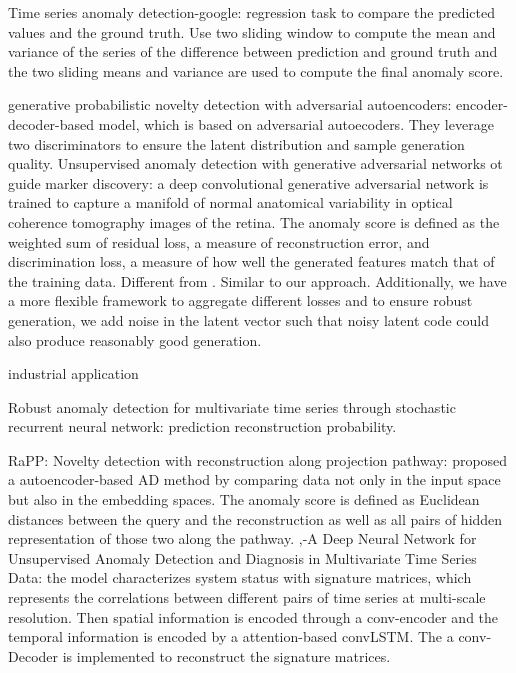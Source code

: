 \documentclass[pmlr]{jmlr}%
\begin{document}
\cite{shipmon2017time} Time series anomaly detection-google: regression task to compare the predicted values and the ground truth. Use two sliding window to compute the mean and variance of the series of the difference between prediction and ground truth and the two sliding means and variance are used to compute the final anomaly score. 

\cite{pidhorskyi2018generative} generative probabilistic novelty detection with adversarial autoencoders: encoder-decoder-based model, which is based on adversarial autoecoders. They leverage two discriminators to ensure the latent distribution and sample generation quality. 
\cite{schlegl2017unsupervised} Unsupervised anomaly detection with generative adversarial networks ot guide marker discovery: a deep convolutional generative adversarial network is trained to capture a manifold of normal anatomical variability in optical coherence tomography images of the retina. The anomaly score is defined as the weighted sum of residual loss, a measure of reconstruction error, and discrimination loss, a measure of how well the generated features match that of the training data. Different from \cite{schlegl2017unsupervised}.
Similar to our approach. Additionally, we have a more flexible framework to aggregate different losses and to ensure robust generation, we add noise in the latent vector such that noisy latent code could also produce reasonably good generation.


industrial application \cite{su2019robust}

\cite{su2019robust} Robust anomaly detection for multivariate time series through stochastic recurrent neural network: prediction reconstruction probability.


\cite{kim2019rapp} RaPP: Novelty detection with reconstruction along projection pathway: proposed a autoencoder-based AD method by comparing data not only in the input space but also in the embedding spaces. The anomaly score is defined as Euclidean distances between the query and the reconstruction as well as all pairs of hidden representation of those two along the pathway.
\cite{zhang2019deep},-A Deep Neural Network for Unsupervised Anomaly Detection and Diagnosis in Multivariate Time Series Data: the model characterizes system status with signature matrices, which represents the correlations between different pairs of time series at multi-scale resolution. Then spatial information is encoded through a conv-encoder and the temporal information is encoded by a attention-based convLSTM. The a conv-Decoder is implemented to reconstruct the signature matrices.
\end{document}
